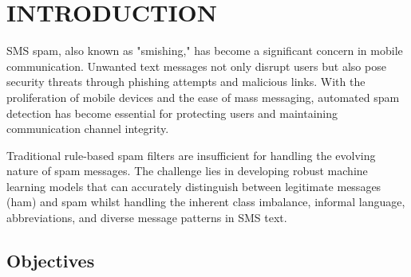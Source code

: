 \documentclass[a4paper,
               ]{jacow}
\begin{document}
%
\begin{abstract}
This case study presents a comprehensive comparative analysis of machine learning approaches for SMS spam detection. Five distinct models were implemented and evaluated: Logistic Regression, Multinomial Naive Bayes, Random Forest, Support Vector Machine (SVM), and Long Short-Term Memory (LSTM) neural network. The study utilised the UCI SMS Spam Collection dataset containing 5,574 labelled messages. Text preprocessing included lowercasing, URL/email removal, stopword elimination, and lemmatisation. Feature extraction employed TF-IDF vectorisation (5,000 features with bigrams) for traditional models and sequence tokenisation (10,000 vocabulary, 100 max length) for LSTM. Results demonstrate that the LSTM model achieved the best overall performance with 98.03\% accuracy and 0.9241 F1-score, whilst Random Forest achieved perfect precision (100\%) and the highest ROC-AUC (0.9862). All models exceeded 96.5\% accuracy, indicating SMS spam detection is well-suited for machine learning. The study provides insights into the trade-offs between model complexity, training time, and performance metrics.
\end{abstract}

\section{INTRODUCTION}

SMS spam, also known as "smishing," has become a significant concern in mobile communication. Unwanted text messages not only disrupt users but also pose security threats through phishing attempts and malicious links. With the proliferation of mobile devices and the ease of mass messaging, automated spam detection has become essential for protecting users and maintaining communication channel integrity.

Traditional rule-based spam filters are insufficient for handling the evolving nature of spam messages. The challenge lies in developing robust machine learning models that can accurately distinguish between legitimate messages (ham) and spam whilst handling the inherent class imbalance, informal language, abbreviations, and diverse message patterns in SMS text.

\subsection{Objectives}
\end{document}
